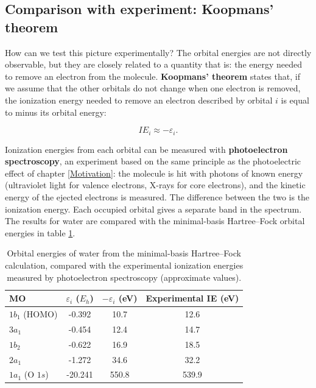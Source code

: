 \documentclass[
  english,
  9pt,
]{extbook}
\theoremstyle{definition}
\theoremstyle{definition}
\theoremstyle{definition}
\theoremstyle{definition}
\theoremstyle{remark}
\begin{document}
\subsection{Comparison with experiment: Koopmans' theorem}\label{comparison-with-experiment-koopmans-theorem}

How can we test this picture experimentally? The orbital energies are not directly observable, but they are closely related to a quantity that is: the energy needed to remove an electron from the molecule. \textbf{Koopmans' theorem} states that, if we assume that the other orbitals do not change when one electron is removed, the ionization energy needed to remove an electron described by orbital \(i\) is equal to minus its orbital energy:

\begin{equation}
IE_i \approx -\varepsilon_i.
\label{eq:koopmans}
\end{equation}

Ionization energies from each orbital can be measured with \textbf{photoelectron spectroscopy}, an experiment based on the same principle as the photoelectric effect of chapter \ref{Motivation}: the molecule is hit with photons of known energy (ultraviolet light for valence electrons, X-rays for core electrons), and the kinetic energy of the ejected electrons is measured. The difference between the two is the ionization energy. Each occupied orbital gives a separate band in the spectrum. The results for water are compared with the minimal-basis Hartree--Fock orbital energies in table \ref{tab:tab1c12}.

\begin{table}

\caption{\label{tab:tab1c12}Orbital energies of water from the minimal-basis Hartree–Fock calculation, compared with the experimental ionization energies measured by photoelectron spectroscopy (approximate values).}
\centering
\begin{tabular}[t]{l|c|c|c}
\hline
MO & $\varepsilon_i$ ($E_h$) & $-\varepsilon_i$ (eV) & Experimental IE (eV)\\
\hline
$1b_1$ (HOMO) & -0.392 & 10.7 & 12.6\\
\hline
$3a_1$ & -0.454 & 12.4 & 14.7\\
\hline
$1b_2$ & -0.622 & 16.9 & 18.5\\
\hline
$2a_1$ & -1.272 & 34.6 & 32.2\\
\hline
$1a_1$ (O $1s$) & -20.241 & 550.8 & 539.9\\
\hline
\end{tabular}
\end{table}
\end{document}
